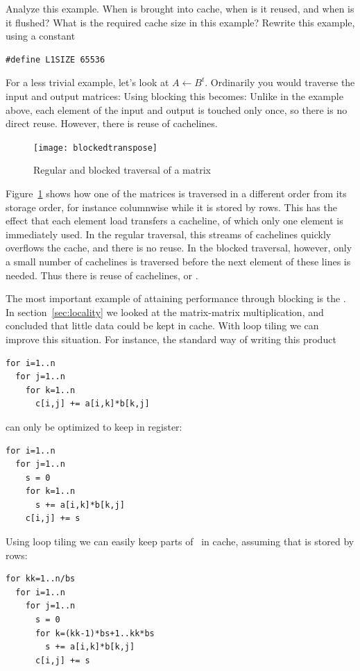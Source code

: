 \begin{exercise}
  Analyze this example. When is  brought into cache, when is it
  reused, and when is it flushed? What is the required cache size in
  this example? Rewrite this example, using a constant
\begin{verbatim}
#define L1SIZE 65536
\end{verbatim}
\end{exercise}

For a less trivial example, let's look at
 $A\leftarrow B^t$. Ordinarily you would traverse
the input and output matrices:
%
%
Using blocking this becomes:
%
%
Unlike in the example above, each element of the input and output is
touched only once, so there is no direct reuse. However, there is
reuse of cachelines. 

\begin{figure}[ht]
  \texttt{[image: blockedtranspose]}
  \caption{Regular and blocked traversal of a matrix}
  \label{fig:blockedtranspose}
\end{figure}
Figure~\ref{fig:blockedtranspose} shows how one of the matrices is
traversed in a different order from its storage order, for instance
columnwise while it is stored by rows. This has the effect that each
element load transfers a cacheline, of which only one element is
immediately used. In the regular traversal, this streams of cachelines
quickly overflows the cache, and there is no reuse. In the blocked
traversal, however, only a small number of cachelines is traversed
before the next element of these lines is needed. Thus there is reuse
of cachelines, or .

The most important example of attaining performance through blocking
is the .
In section~\ref{sec:locality} we looked at the matrix-matrix
multiplication, and concluded that little data could be kept in
cache. With loop tiling we can improve this situation. For instance,
the standard way of writing this product
\begin{verbatim}
for i=1..n
  for j=1..n
    for k=1..n
      c[i,j] += a[i,k]*b[k,j]
\end{verbatim}
can only be optimized to keep  in register:
\begin{verbatim}
for i=1..n
  for j=1..n
    s = 0
    for k=1..n
      s += a[i,k]*b[k,j]
    c[i,j] += s
\end{verbatim}
Using loop tiling we can easily keep parts of~ in cache,
assuming that  is stored by rows:
\begin{verbatim}
for kk=1..n/bs
  for i=1..n
    for j=1..n
      s = 0
      for k=(kk-1)*bs+1..kk*bs
        s += a[i,k]*b[k,j]
      c[i,j] += s
\end{verbatim}


